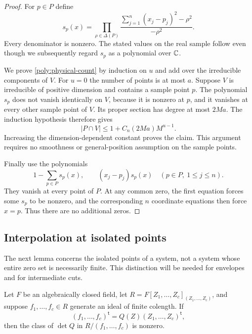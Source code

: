 \begin{proof}
For $p\in P$ define
\[
 s_p(x)=\prod_{\rho\in\Delta(P)}
       \frac{\sum_{j=1}^n(x_j-p_j)^2-\rho^2}{-\rho^2}.
\]
Every denominator is nonzero.  The stated values on the real sample
follow even though we subsequently regard $s_p$ as a polynomial over
$\mathbb C$.

We prove \eqref{poly:physical-count} by induction on $u$ and add over the
irreducible components of $V$.  For $u=0$ the number of points is at most
$a$.  Suppose $V$ is irreducible of positive dimension and contains a
sample point $p$.  The polynomial $s_p$ does not vanish identically on
$V$, because it is nonzero at $p$, and it vanishes at every other sample
point of $V$.  Its proper section has degree at most $2Ma$.  The induction
hypothesis therefore gives
\[
 |P\cap V|\le 1+C_n(2Ma)M^{u-1}.
\]
Increasing the dimension-dependent constant proves the claim.  This
argument requires no smoothness or general-position assumption on the
sample points.

Finally use the polynomials
\begin{equation}\label{poly:exact-isolation}
 1-\sum_{p\in P}s_p(x),\qquad
 (x_j-p_j)s_p(x)\quad(p\in P,\ 1\le j\le n).
\end{equation}
They vanish at every point of $P$.  At any common zero, the first equation
forces some $s_p$ to be nonzero, and the corresponding $n$ coordinate
equations then force $x=p$.  Thus there are no additional zeros.
\end{proof}

\subsection{Interpolation at isolated points}

The next lemma concerns the isolated points of a system, not a system
whose entire zero set is necessarily finite.  This distinction will be
needed for envelopes and for intermediate cuts.

\begin{lemma}
\label{poly:socle}
Let $F$ be an algebraically closed field, let
$R=F[Z_1,\ldots,Z_c]_{(Z_1,\ldots,Z_c)}$, and suppose
$f_1,\ldots,f_c\in R$ generate an ideal of finite colength.  If
\[
 (f_1,\ldots,f_c)^{\mathsf t}
       =Q(Z)(Z_1,\ldots,Z_c)^{\mathsf t},
\]
then the class of $\det Q$ in $R/(f_1,\ldots,f_c)$ is nonzero.
\end{lemma}

